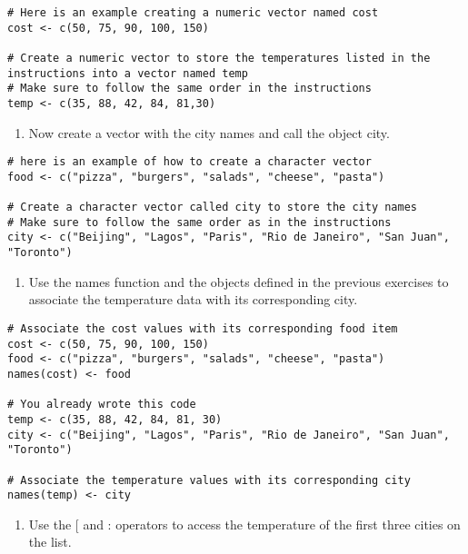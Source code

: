 \documentclass[
]{article}
\providecommand{\tightlist}{%
  \setlength{\itemsep}{0pt}\setlength{\parskip}{0pt}}
\begin{document}
\begin{verbatim}
# Here is an example creating a numeric vector named cost
cost <- c(50, 75, 90, 100, 150)

# Create a numeric vector to store the temperatures listed in the instructions into a vector named temp
# Make sure to follow the same order in the instructions
temp <- c(35, 88, 42, 84, 81,30)
\end{verbatim}

\begin{enumerate}
\def\labelenumi{\arabic{enumi}.}
\setcounter{enumi}{1}
\tightlist
\item
  Now create a vector with the city names and call the object city.
\end{enumerate}

\begin{verbatim}
# here is an example of how to create a character vector
food <- c("pizza", "burgers", "salads", "cheese", "pasta")

# Create a character vector called city to store the city names
# Make sure to follow the same order as in the instructions
city <- c("Beijing", "Lagos", "Paris", "Rio de Janeiro", "San Juan", "Toronto")
\end{verbatim}

\begin{enumerate}
\def\labelenumi{\arabic{enumi}.}
\setcounter{enumi}{2}
\tightlist
\item
  Use the names function and the objects defined in the previous
  exercises to associate the temperature data with its corresponding
  city.
\end{enumerate}

\begin{verbatim}
# Associate the cost values with its corresponding food item
cost <- c(50, 75, 90, 100, 150)
food <- c("pizza", "burgers", "salads", "cheese", "pasta")
names(cost) <- food

# You already wrote this code
temp <- c(35, 88, 42, 84, 81, 30)
city <- c("Beijing", "Lagos", "Paris", "Rio de Janeiro", "San Juan", "Toronto")

# Associate the temperature values with its corresponding city
names(temp) <- city
\end{verbatim}

\begin{enumerate}
\def\labelenumi{\arabic{enumi}.}
\setcounter{enumi}{3}
\tightlist
\item
  Use the {[} and : operators to access the temperature of the first
  three cities on the list.
\end{enumerate}
\end{document}
